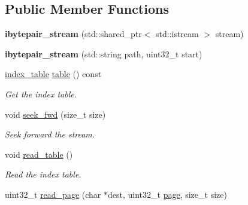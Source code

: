 \subsection*{Public Member Functions}
\begin{DoxyCompactItemize}
\item 
\mbox{\label{classeka2l1_1_1common_1_1ibytepair__stream_a006f99de4dc2811d84335a088cb88834}} 
{\bfseries ibytepair\+\_\+stream} (std\+::shared\+\_\+ptr$<$ std\+::istream $>$ stream)
\item 
\mbox{\label{classeka2l1_1_1common_1_1ibytepair__stream_ad8990576d3dcd80caf8d59ab077c943e}} 
{\bfseries ibytepair\+\_\+stream} (std\+::string path, uint32\+\_\+t start)
\item 
\mbox{\label{classeka2l1_1_1common_1_1ibytepair__stream_a65b425df4510ac94c9917a6d578c1650}} 
\mbox{\hyperlink{structeka2l1_1_1common_1_1ibytepair__stream_1_1index__table}{index\+\_\+table}} \mbox{\hyperlink{classeka2l1_1_1common_1_1ibytepair__stream_a65b425df4510ac94c9917a6d578c1650}{table}} () const
\begin{DoxyCompactList}\small\item\em Get the index table. \end{DoxyCompactList}\item 
\mbox{\label{classeka2l1_1_1common_1_1ibytepair__stream_aa5065e13433aa088b17156165722687a}} 
void \mbox{\hyperlink{classeka2l1_1_1common_1_1ibytepair__stream_aa5065e13433aa088b17156165722687a}{seek\+\_\+fwd}} (size\+\_\+t size)
\begin{DoxyCompactList}\small\item\em Seek forward the stream. \end{DoxyCompactList}\item 
void \mbox{\hyperlink{classeka2l1_1_1common_1_1ibytepair__stream_a721832bf82c79afb26b572adc05c571b}{read\+\_\+table}} ()
\begin{DoxyCompactList}\small\item\em Read the index table. \end{DoxyCompactList}\item 
uint32\+\_\+t \mbox{\hyperlink{classeka2l1_1_1common_1_1ibytepair__stream_ac6d986066799b2aece89b96cb5c00ce7}{read\+\_\+page}} (char $\ast$dest, uint32\+\_\+t \mbox{\hyperlink{structeka2l1_1_1page}{page}}, size\+\_\+t size)

\end{DoxyCompactItemize}
